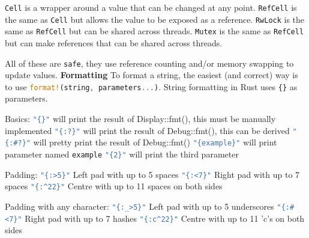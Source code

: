 \documentclass[a4paper,11pt]{article}
\begin{document}
\lstinline[language=Rust]{Cell} is a wrapper around a value that can be changed at any point.
\newline
\lstinline[language=Rust]{RefCell} is the same as \lstinline[language=Rust]{Cell} but allows the value to be exposed as a reference.
\newline
\lstinline[language=Rust]{RwLock} is the same as \lstinline[language=Rust]{RefCell} but can be shared across threads.
\newline
\lstinline[language=Rust]{Mutex} is the same as \lstinline[language=Rust]{RefCell} but can make references that can be shared across threads.

All of these are \lstinline[language=Rust]{safe}, they use reference counting and/or memory swapping to update values.
\medskip
\medskip
\newline
\textbf{Formatting}
\newline
To format a string, the easiest (and correct) way is to use \lstinline[language=Rust]{format!(string, parameters...)}. String formatting in Rust uses \lstinline|{}| as parameters. 
\newline

Basics:
\newline
\lstinline[language=Rust]|"{}"| will print the result of Display::fmt(), this must be manually implemented
\newline
\lstinline[language=Rust]|"{:?}"| will print the result of Debug::fmt(), this can be derived
\newline
\lstinline[language=Rust]|"{:#?}"| will pretty print the result of Debug::fmt()
\newline
\lstinline[language=Rust]|"{example}"| will print parameter named \lstinline|example|
\newline
\lstinline[language=Rust]|"{2}"| will print the third parameter
\newline

Padding:
\newline
\lstinline[language=Rust]|"{:>5}"| Left pad with up to 5 spaces
\newline
\lstinline[language=Rust]|"{:<7}"| Right pad with up to 7 spaces
\newline
\lstinline[language=Rust]|"{:^22}"| Centre with up to 11 spaces on both sides
\newline

Padding with any character:
\newline
\lstinline[language=Rust]|"{:_>5}"| Left pad with up to 5 underscores
\newline
\lstinline[language=Rust]|"{:#<7}"| Right pad with up to 7 hashes
\newline
\lstinline[language=Rust]|"{:c^22}"| Centre with up to 11 'c's on both sides
\newline
\end{document}
